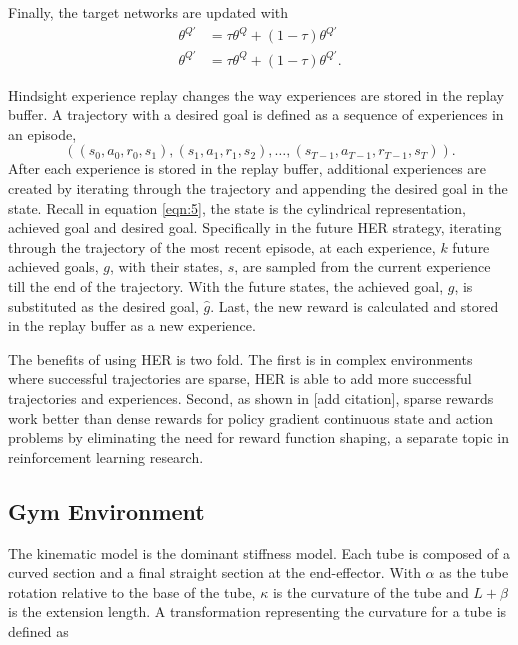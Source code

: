Finally, the target networks are updated with
\begin{align}
    \theta^{Q'} &= \tau \theta^Q + (1 - \tau)\theta^{Q'} \\
    \theta^{Q'} &= \tau \theta^Q + (1 - \tau)\theta^{Q'}.    
\end{align}

Hindsight experience replay changes the way experiences are stored in the replay buffer. A trajectory with a desired goal is defined as a sequence of experiences in an episode,
\begin{equation}
\left( \left(s_0, a_0, r_0, s_1 \right), \left( s_1, a_1, r_1, s_2 \right), \dots, \left( s_{T-1}, a_{T-1}, r_{T-1}, s_T \right) \right).
\end{equation}
After each experience is stored in the replay buffer, additional experiences are created by iterating through the trajectory and appending the desired goal in the state. Recall in equation \ref{eqn:5}, the state is the cylindrical representation, achieved goal and desired goal. Specifically in the future HER strategy, iterating through the trajectory of the most recent episode, at each experience, $k$ future achieved goals, $g$, with their states, $s$, are sampled from the current experience till the end of the trajectory. With the future states, the achieved goal, $g$, is substituted as the desired goal, $\hat{g}$. Last, the new reward is calculated and stored in the replay buffer as a new experience.

The benefits of using HER is two fold. The first is in complex environments where successful trajectories are sparse, HER is able to add more successful trajectories and experiences. Second, as shown in [add citation], sparse rewards work better than dense rewards for policy gradient continuous state and action problems by eliminating the need for reward function shaping, a separate topic in reinforcement learning research.

\subsection{Gym Environment}
The kinematic model is the dominant stiffness model. Each tube is composed of a curved section and a final straight section at the end-effector. With $\alpha$ as the tube rotation relative to the base of the tube, $\kappa$ is the curvature of the tube and $L + \beta$ is the extension length. A transformation representing the curvature for a tube is defined as

